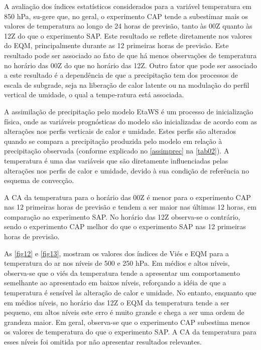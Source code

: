 A avaliação dos índices estatísticos considerados para a variável temperatura em 850 hPa, su-gere que, no geral, o experimento CAP tende a subestimar mais os valores de temperatura ao longo de 24 horas de previsão, tanto às 00Z quanto às 12Z do que o experimento SAP. Este resultado se reflete diretamente nos valores do EQM, principalmente durante as 12 primeiras horas de previsão. Este resultado pode ser associado ao fato de que há menos observações de temperatura no horário das 00Z do que no horário das 12Z. Outro fator que pode ser associado a este resultado é a dependência de que a precipitação tem dos processos de escala de subgrade, seja na liberação de calor latente ou na modulação do perfil vertical de umidade, o qual a tempe-ratura está associada.

A assimilação de precipitação pelo modelo EtaWS é um processo de inicialização física, onde as variáveis prognósticas do modelo são inicializadas de acordo com as alterações nos perfis verticais de calor e umidade. Estes perfis são alterados quando se compara a precipitação produzida pelo modelo em relação à precipitação observada (conforme explicado no \autoref{assimprec} na \autoref{tab02}). A temperatura é uma das variáveis que são diretamente influenciadas pelas alterações nos perfis de calor e umidade, devido à sua condição de referência no esquema de convecção. 

A CA da temperatura para o horário das 00Z é menor para o experimento CAP nas 12 primeiras horas de previsão e tendem a ser maior nas últimas 12 horas, em comparação ao experimento SAP. No horário das 12Z observa-se o contrário, sendo o experimento CAP melhor do que o experimento SAP nas 12 primeiras horas de previsão.

As \autoref{fig12} e \autoref{fig13}, mostram os valores dos índices de Viés e EQM para a temperatura do ar nos níveis de 500 e 250 hPa. Em médios e altos níveis, observa-se que o viés da temperatura tende a apresentar um comportamento semelhante ao apresentado em baixos níveis, reforçando a idéia de que a temperatura é sensível às alteração de calor e umidade. No entanto, enquanto que em médios níveis, no horário das 12Z o EQM da temperatura tende a ser pequeno, em altos níveis este erro é muito grande e chega a ser uma ordem de grandeza maior. Em geral, observa-se que o experimento CAP subestima menos os valores de temperatura do que o experimento SAP. A CA da temperatura para esses níveis foi omitida por não apresentar resultados relevantes.
     
